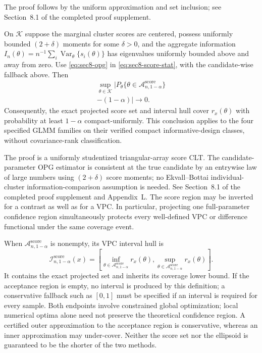 The proof follows by the uniform approximation and set inclusion; see Section~8.1 of the completed proof supplement.

\begin{theorem}
\label{thm:sec8-score-verified}
On $\mathcal K$ suppose the marginal cluster scores are centered,
possess uniformly bounded $(2+\delta)$ moments for some $\delta>0$,
and the aggregate information
$I_n(\theta)=n^{-1}\sum_i\operatorname{Var}_\theta\{s_i(\theta)\}$
has eigenvalues uniformly bounded above and away from zero.
Use \eqref{eq:sec8-opg} in \eqref{eq:sec8-score-stat}, with the
candidate-wise fallback above. Then
\begin{equation}\label{eq:sec8-score-verified}
\begin{aligned}
\sup_{\theta\in\mathcal K}\big|
P_\theta\{\theta\in\mathcal A_{n,1-\alpha}^{\mathrm{score}}\}\\
-(1-\alpha)\big|\longrightarrow0.
\end{aligned}
\end{equation}
Consequently, the exact projected score set and interval hull
cover $r_x(\theta)$ with probability at least $1-\alpha$
compact-uniformly. This conclusion applies to the four
specified GLMM families on their verified compact informative-design
classes, without covariance-rank classification.
\end{theorem}

The proof is a uniformly studentized triangular-array score CLT.
The candidate-parameter OPG estimator is consistent at the true
candidate by an entrywise law of large numbers using
$(2+\delta)$ score moments; no Ekvall--Bottai
individual-cluster information-comparison assumption is needed.
See Section~8.1 of the completed proof supplement and Appendix~L.
The score region may be inverted for a contrast as well as for a VPC.
In particular, projecting one full-parameter confidence region
simultaneously protects every well-defined VPC or difference
functional under the same coverage event.


When $\mathcal A_{n,1-\alpha}^{\mathrm{score}}$ is nonempty,
its VPC interval hull is
\begin{equation}\label{eq:sec8-score-interval}
\mathcal I_{n,1-\alpha}^{\mathrm{score}}(x)
=\left[
\inf_{\theta\in\mathcal A_{n,1-\alpha}^{\mathrm{score}}}r_x(\theta),
\sup_{\theta\in\mathcal A_{n,1-\alpha}^{\mathrm{score}}}r_x(\theta)
\right].
\end{equation}
It contains the exact projected set and inherits its coverage lower
bound. If the acceptance region is empty, no interval is produced by
this definition; a conservative fallback such as $[0,1]$ must be
specified if an interval is required for every sample. Both endpoints
involve constrained global optimization; local numerical optima alone
need not preserve the theoretical confidence region. A certified outer
approximation to the acceptance region is conservative, whereas an
inner approximation may under-cover.
Neither the score set nor the ellipsoid is guaranteed to be the shorter
of the two methods.


